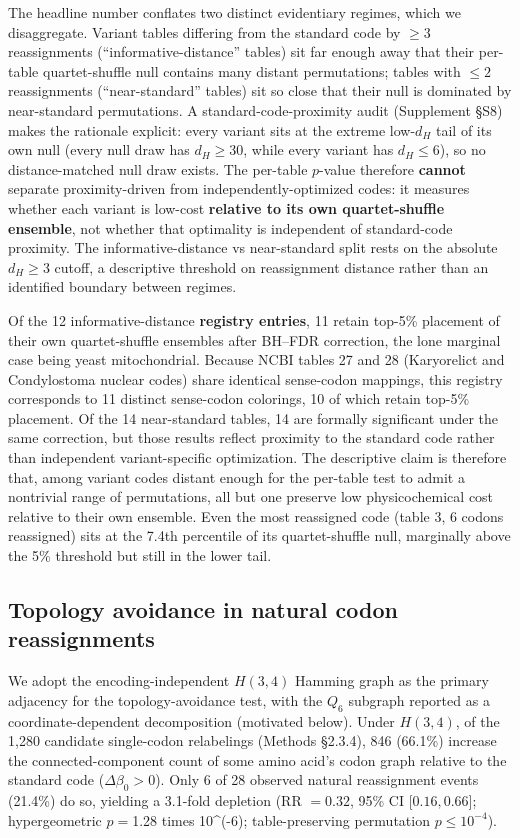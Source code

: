 \documentclass[preprint,11pt,authoryear,a4paper]{elsarticle}
\begin{document}
The headline number conflates two distinct evidentiary regimes, which we
disaggregate. Variant tables differing from the standard code by
\(\geq 3\) reassignments (``informative-distance'' tables) sit far
enough away that their per-table quartet-shuffle null contains many
distant permutations; tables with \(\leq 2\) reassignments
(``near-standard'' tables) sit so close that their null is dominated by
near-standard permutations. A standard-code-proximity audit (Supplement
§S8) makes the rationale explicit: every variant sits at the extreme
low-\(d_{H}\) tail of its own null (every null draw has
\(d_{H} \geq 30\), while every variant has \(d_{H} \leq 6\)), so no
distance-matched null draw exists. The per-table \(p\)-value therefore
\textbf{cannot} separate proximity-driven from independently-optimized
codes: it measures whether each variant is low-cost \textbf{relative to
its own quartet-shuffle ensemble}, not whether that optimality is
independent of standard-code proximity. The informative-distance vs
near-standard split rests on the absolute \(d_{H} \geq 3\) cutoff, a
descriptive threshold on reassignment distance rather than an identified
boundary between regimes.

Of the 12 informative-distance \textbf{registry entries}, 11 retain
top-5\% placement of their own quartet-shuffle ensembles after BH--FDR
correction, the lone marginal case being yeast mitochondrial. Because
NCBI tables 27 and 28 (Karyorelict and Condylostoma nuclear codes) share
identical sense-codon mappings, this registry corresponds to 11 distinct
sense-codon colorings, 10 of which retain top-5\% placement. Of the 14
near-standard tables, 14 are formally significant under the same
correction, but those results reflect proximity to the standard code
rather than independent variant-specific optimization. The descriptive
claim is therefore that, among variant codes distant enough for the
per-table test to admit a nontrivial range of permutations, all but one
preserve low physicochemical cost relative to their own ensemble. Even
the most reassigned code (table 3, 6 codons reassigned) sits at the
7.4th percentile of its quartet-shuffle null, marginally above the 5\%
threshold but still in the lower tail.

\subsection{Topology avoidance in natural codon
reassignments}\label{sec:res-topo}

We adopt the encoding-independent \(H(3,4)\) Hamming graph as the
primary adjacency for the topology-avoidance test, with the \(Q_{6}\)
subgraph reported as a coordinate-dependent decomposition (motivated
below). Under \(H(3,4)\), of the 1,280 candidate single-codon
relabelings (Methods §2.3.4), 846 (66.1\%) increase the
connected-component count of some amino acid's codon graph relative to
the standard code (\(\Delta\beta_{0} > 0\)). Only 6 of 28 observed
natural reassignment events (21.4\%) do so, yielding a 3.1-fold
depletion (\(\text{RR } = 0.32\), 95\% CI \(\lbrack 0.16,0.66\rbrack\);
hypergeometric \(p =\)1.28 times 10\^{}(-6)\(\); table-preserving
permutation \(p \leq 10^{- 4}\)).
\end{document}
